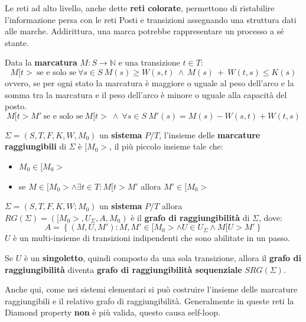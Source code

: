 Le reti ad alto livello, anche dette \textbf{reti colorate}, permettono di
ristabilire l'informazione persa con le reti Posti e transizioni assegnando una
struttura dati alle marche. Addirittura, una marca potrebbe rappresentare un
processo a sé stante.
\begin{definizione}
    Data la \textbf{marcatura} $M: S \to \mathbb{N}$ e una transizione $t \in T$:
    \begin{equation}
        M[t > \ \text{se e solo se} \ \forall s \in S \ M(s) \geq W(s, t) \ \land
        \ M(s) \ + \ W(t, s) \leq K(s)
    \end{equation}
    ovvero, se per ogni stato la marcatura è maggiore o uguale al peso dell'arco
    e la somma tra la marcatura e il peso dell'arco è minore o uguale alla capacità
    del posto.
    \begin{equation}
        M[t > M' \ \text{se e solo se} \ M[t > \ \land \ \forall s \in S \ M'(s)
        = M(s) - W(s, t) + W(t, s)
    \end{equation}
\end{definizione}
\begin{definizione}
    $\Sigma = (S,T,F,K,W,M_0)$ un \textbf{sistema} $P/T$, l'insieme delle
    \textbf{marcature raggiungibili} di $\Sigma$ è $[M_0>$, il più piccolo
    insieme tale che:
    \begin{itemize}
        \item $M_0\in [M_0>$
        \item se $M\in [M_0>\land \exists t\in T: M[t>M'$ allora $M' \in [M_0>$
    \end{itemize}
\end{definizione}
\begin{definizione}
    $\Sigma = (S,T,F,K,W;M_0)$ un \textbf{sistema} $P/T$ allora
    $RG(\Sigma)=([M_0>,U_\Sigma,A,M_0)$ è il \textbf{grafo di raggiungibilità}
    di $\Sigma$, dove:
    \begin{equation}
        A=\left\{(M,U,M'):M,M'\in [M_0>\land U\in U_\Sigma\land M[U>M' \right\}
    \end{equation}
    $U$ è un multi-insieme di transizioni indipendenti che sono abilitate in un passo.
\end{definizione}
\begin{nota}
    Se $U$ è un \textbf{singoletto}, quindi composto da una sola transizione, allora
    il \textbf{grafo di raggiungibilità} diventa \textbf{grafo di raggiungibilità
        sequenziale} $SRG(\Sigma)$.
\end{nota}
Anche qui, come nei sistemi elementari si può costruire l'insieme delle marcature
raggiungibili e il relativo grafo di raggiungibilità. Generalmente in queste reti
la Diamond property \textbf{non} è più valida, questo causa self-loop.

